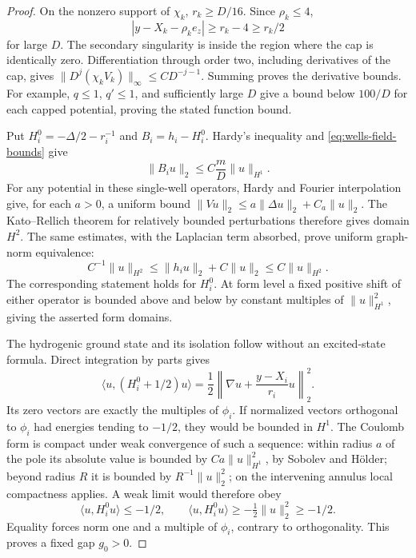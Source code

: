 \begin{proof}
On the nonzero support of \(\chi_k\), \(r_k\ge D/16\). Since \(\rho_k\le4\),
\[
 |y-X_k-\rho_k e_z|\ge r_k-4\ge r_k/2
\]
for large \(D\). The secondary singularity is inside the region where
the cap is identically zero. Differentiation through order two,
including derivatives of the cap, gives
\(\|D^j(\chi_kV_k)\|_\infty\le CD^{-j-1}\).
Summing proves the derivative bounds. For example, \(q\le1\), \(q'\le1\),
and sufficiently large \(D\) give a bound below \(100/D\) for each capped
potential, proving the stated function bound.

Put \(H_i^0=-\Delta/2-r_i^{-1}\) and \(B_i=h_i-H_i^0\).
Hardy's inequality and \eqref{eq:wells-field-bounds} give
\begin{equation}
 \|B_i u\|_2\le C\frac mD\|u\|_{H^1}.
 \label{eq:wells-perturbation}
\end{equation}
For any potential in these single-well operators, Hardy and Fourier
interpolation give, for each \(a>0\), a uniform bound
\(\|Vu\|_2\le a\|\Delta u\|_2+C_a\|u\|_2\).
The Kato--Rellich theorem for relatively bounded perturbations
\cite[Theorem~6.4, p.~135]{Teschl2009} therefore gives domain \(H^2\). The same estimates, with the Laplacian term
absorbed, prove uniform graph-norm equivalence:
\begin{equation}
 C^{-1}\|u\|_{H^2}
 \le \|h_i u\|_2+C\|u\|_2
 \le C\|u\|_{H^2}.
 \label{eq:wells-graph-norm}
\end{equation}
The corresponding statement holds for \(H_i^0\).
At form level a fixed positive shift of either operator is bounded
above and below by constant multiples of \(\|u\|_{H^1}^2\), giving
the asserted form domains.

The hydrogenic ground state and its isolation follow without an
excited-state formula. Direct integration by parts gives
\begin{equation}
 \langle u,(H_i^0+1/2)u\rangle
 =\frac12\left\|\nabla u+\frac{y-X_i}{r_i}u\right\|_2^2.
 \label{eq:wells-hydrogen-square}
\end{equation}
Its zero vectors are exactly the multiples of \(\phi_i\).
If normalized vectors orthogonal to \(\phi_i\) had energies tending to
\(-1/2\), they would be bounded in \(H^1\). The Coulomb form is compact
under weak convergence of such a sequence: within radius \(a\) of the
pole its absolute value is bounded by \(Ca\|u\|_{H^1}^2\), by Sobolev and
H\"older; beyond radius \(R\) it is bounded by \(R^{-1}\|u\|_2^2\);
on the intervening annulus local compactness applies. A weak limit
would therefore obey
\[
 \langle u,H_i^0u\rangle\le-1/2,\qquad
 \langle u,H_i^0u\rangle\ge-\tfrac12\|u\|_2^2\ge-1/2.
\]
Equality forces norm one and a multiple of \(\phi_i\), contrary to
orthogonality. This proves a fixed gap \(g_0>0\).


\end{proof}
